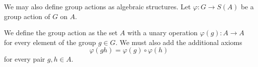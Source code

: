 \begin{remark}\label{remark:group_actions_as_algebraic_structures}
  We may also define group actions as algebraic structures. Let \( \varphi: G \to S(A) \) be a group action of \( G \) on \( A \).

  We define the group action as the set \( A \) with a unary operation \( \varphi(g): A \to A \) for every element of the group \( g \in G \). We must also add the additional axioms
  \begin{equation*}
    \varphi(gh) = \varphi(g) \circ \varphi(h)
  \end{equation*}
  for every pair \( g, h \in A \).
\end{remark}

